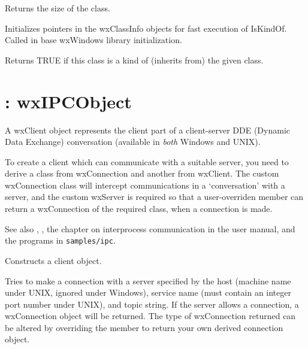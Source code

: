 
Returns the size of the class.



Initializes pointers in the wxClassInfo objects for fast execution
of IsKindOf. Called in base wxWindows library initialization.

\label{wxclassinfoiskindof}


Returns TRUE if this class is a kind of (inherits from) the given class.


\section{: wxIPCObject}\label{wxclient}


A wxClient object represents the client part of a client-server DDE
(Dynamic Data Exchange) conversation (available in {\it both}\/
Windows and UNIX).

To create a client which can communicate with a suitable server,
you need to derive a class from wxConnection and another from wxClient.
The custom wxConnection class will intercept communications in
a `conversation' with a server, and the custom wxServer is required
so that a user-overriden  member can return
a wxConnection of the required class, when a connection is made.

See also , ,
the chapter on interprocess communication in the user manual, and
the programs in {\tt samples/ipc}.




Constructs a client object.

\label{wxclientmakeconnection}


Tries to make a connection with a server specified by the host
(machine name under UNIX, ignored under Windows), service name (must
contain an integer port number under UNIX), and topic string. If the
server allows a connection, a wxConnection object will be returned.
The type of wxConnection returned can be altered by overriding
the  member to return your own
derived connection object.

